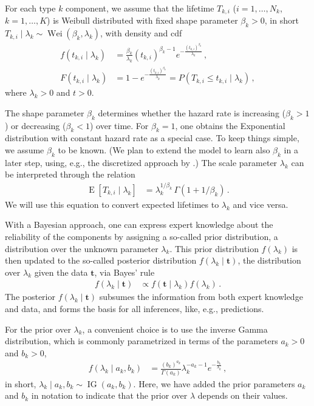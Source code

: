 \documentclass[authoryear]{elsarticle}
\renewcommand{\vec}[1]{{\bm#1}}
\newcommand{\E}{\operatorname{E}}
\newcommand{\wei}{\operatorname{Wei}} %
\newcommand{\ig}{\operatorname{IG}}   %
\begin{document}
For each type $k$ component, we assume that the lifetime $T_{k,i}$ ($i=1,\ldots,N_k$, $k = 1, \ldots, K$)
is Weibull distributed with fixed shape parameter $\beta_k > 0$,
in short $T_{k,i} \mid \lambda_k \sim \wei(\beta_k,\lambda_k)$,
with density and cdf
\begin{align}
\label{eq:weibulldens}
f(t_{k,i} \mid \lambda_k) &= \frac{\beta_k}{\lambda_k} (t_{k,i})^{\beta_k-1} e^{-\frac{(t_{k,i})^{\beta_k}}{\lambda_k}}\,, \\
\label{eq:weibullcdf}
F(t_{k,i} \mid \lambda_k) &= 1 - e^{-\frac{(t_{k,i})^{\beta_k}}{\lambda_k}} = P(T_{k,i} \leq t_{k,i} \mid \lambda_k)\,,
\end{align}
where $\lambda_k > 0$ and $t > 0$.

The shape parameter $\beta_k$ determines whether the hazard rate is increasing ($\beta_k > 1$)
or decreasing ($\beta_k < 1$) over time.
For $\beta_k=1$, one obtains the Exponential distribution with constant hazard rate as a special case.
To keep things simple, we assume $\beta_k$ to be known.
(We plan to extend the model to learn also $\beta_k$ in a later step,
using, e.g., the discretized approach by \cite{1969:soland}.)
The scale parameter $\lambda_k$ can be interpreted through the relation
\begin{align}
\E[T_{k,i} \mid \lambda_k] &= \lambda_k^{1/\beta_k}\, \Gamma(1 + 1/\beta_k)\,.
\label{eq:lambdainterpret}
\end{align}
We will use this equation to convert expected lifetimes to $\lambda_k$ and vice versa.

With a Bayesian approach, one can express expert knowledge about the reliability of the components
by assigning a so-called prior distribution,
a distribution over the unknown parameter $\lambda_k$.
This prior distribution $f(\lambda_k)$ is then updated 
to the so-called posterior distribution $f(\lambda_k \mid \vec{t})$,
the distribution over $\lambda_k$ given the data $\vec{t}$,
via Bayes' rule
\begin{align*}
f(\lambda_k \mid \vec{t}) &\propto f(\vec{t}\mid\lambda_k) f(\lambda_k)\,.
\end{align*}
The posterior $f(\lambda_k \mid \vec{t})$ subsumes the information
from both expert knowledge and data,
and forms the basis for all inferences, like, e.g., predictions.

For the prior over $\lambda_k$,
a convenient choice is to use the inverse Gamma distribution,
which is commonly parametrized in terms of the parameters $a_k > 0$ and $b_k > 0$,
\begin{align}
f(\lambda_k\mid a_k,b_k) &= \frac{(b_k)^{a_k}}{\Gamma(a_k)} \lambda_k^{-a_k -1} e^{-\frac{b_k}{\lambda_k}}\,,
\label{eq:ig-def}
\end{align}
in short, $\lambda_k \mid a_k, b_k \sim \ig(a_k,b_k)$.
Here, we have added the prior parameters $a_k$ and $b_k$ in notation
to indicate that the prior over $\lambda$ depends on their values.
\end{document}
